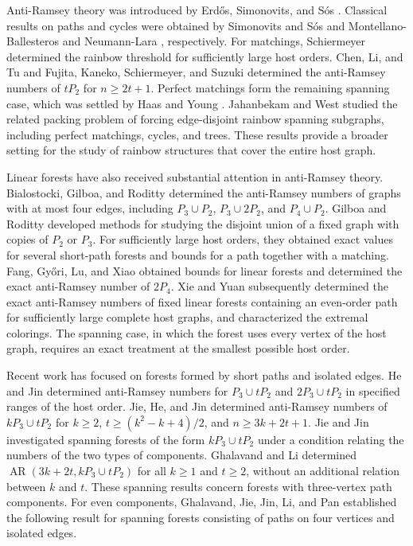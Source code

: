 \documentclass[10pt,a4paper]{article}
\DeclareMathOperator{\AR}{AR}
\begin{document}
Anti-Ramsey theory was introduced by Erd\H{o}s, Simonovits, and S\'os
\cite{ESS}. Classical results on paths and cycles were obtained by
Simonovits and S\'os \cite{SS} and Montellano-Ballesteros and
Neumann-Lara \cite{MBNL}, respectively. For matchings, Schiermeyer
\cite{Sch} determined the rainbow threshold for sufficiently large
host orders. Chen, Li, and Tu \cite{CLT} and Fujita, Kaneko,
Schiermeyer, and Suzuki \cite{FKSS} determined the anti-Ramsey numbers
of $tP_2$ for $n\ge2t+1$. Perfect matchings form the remaining
spanning case, which was settled by Haas and Young \cite{HY}.
Jahanbekam and West \cite{JW} studied the related packing problem of
forcing edge-disjoint rainbow spanning subgraphs, including perfect
matchings, cycles, and trees. These results provide a broader setting
for the study of rainbow structures that cover the entire host graph.

Linear forests have also received substantial attention in anti-Ramsey
theory. Bialostocki, Gilboa, and Roditty \cite{BGR} determined the
anti-Ramsey numbers of graphs with at most four edges, including
$P_3\cup P_2$, $P_3\cup2P_2$, and $P_4\cup P_2$.
Gilboa and Roditty \cite{GR} developed methods for studying the
disjoint union of a fixed graph with copies of $P_2$ or $P_3$.
For sufficiently large host orders, they obtained exact values for
several short-path forests and bounds for a path together with a
matching. Fang, Gy\H{o}ri, Lu, and Xiao \cite{FGLX} obtained bounds for
linear forests and determined the exact anti-Ramsey number of $2P_4$.
Xie and Yuan \cite{XY} subsequently determined the exact anti-Ramsey
numbers of fixed linear forests containing an even-order path for
sufficiently large complete host graphs, and characterized the extremal
colorings. The spanning case, in which the forest uses every vertex of
the host graph, requires an exact treatment at the smallest possible
host order.

Recent work has focused on forests formed by short paths and isolated
edges. He and Jin \cite{HJ} determined anti-Ramsey numbers for
$P_3\cup tP_2$ and $2P_3\cup tP_2$ in specified ranges of the host order.
Jie, He, and Jin \cite{JHJ} determined anti-Ramsey numbers of
$kP_3\cup tP_2$ for $k\ge2$, $t\ge(k^2-k+4)/2$, and
$n\ge3k+2t+1$.
Jie and Jin \cite{JJ} investigated spanning forests of the form
$kP_3\cup tP_2$ under a condition relating the numbers of the two types
of components. Ghalavand and Li \cite{GL} determined
$\AR(3k+2t,kP_3\cup tP_2)$ for all $k\ge1$ and $t\ge2$, without
an additional relation between $k$ and $t$.
These spanning results concern forests with three-vertex path components.
For even components, Ghalavand, Jie, Jin, Li, and Pan
\cite{GJJLP} established the following result for spanning forests
consisting of paths on four vertices and isolated edges.
\end{document}
